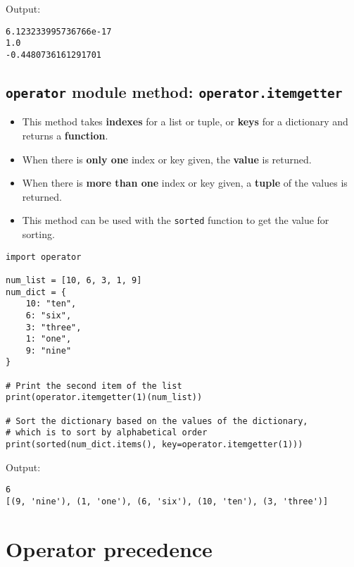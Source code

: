 \documentclass[11pt]{article}
\begin{document}
 \noindent Output:

\label{org34d6b48}
\begin{verbatim}
6.123233995736766e-17
1.0
-0.4480736161291701
\end{verbatim}


 \newpage
\subsection{\texttt{operator} module method: \texttt{operator.itemgetter}}
\label{sec:org1f9dfff}
\begin{itemize}
\item This method takes \textbf{indexes} for a list or tuple, or \textbf{keys} for a dictionary and returns a \textbf{function}.
\item When there is \textbf{only one} index or key given, the \textbf{value} is returned.
\item When there is \textbf{more than one} index or key given, a \textbf{tuple} of the values is returned.
\item This method can be used with the \texttt{sorted} function to get the value for sorting.
\end{itemize}

\begin{verbatim}
import operator

num_list = [10, 6, 3, 1, 9]
num_dict = {
    10: "ten",
    6: "six",
    3: "three",
    1: "one",
    9: "nine"
}

# Print the second item of the list
print(operator.itemgetter(1)(num_list))

# Sort the dictionary based on the values of the dictionary,
# which is to sort by alphabetical order
print(sorted(num_dict.items(), key=operator.itemgetter(1)))
\end{verbatim}

 \noindent Output:

\label{org016bef3}
\begin{verbatim}
6
[(9, 'nine'), (1, 'one'), (6, 'six'), (10, 'ten'), (3, 'three')]
\end{verbatim}


 \newpage
\section{Operator precedence}
\label{sec:orgc9458b3}
\end{document}
